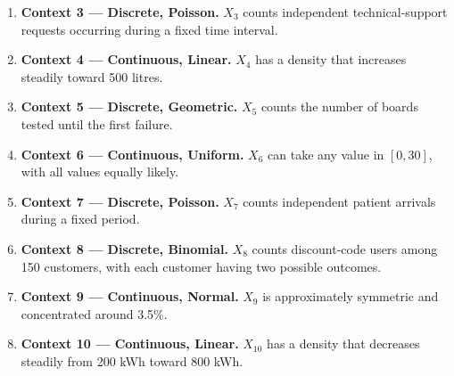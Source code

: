 {\begin{enumerate}
			\item \textbf{Context 3 — Discrete, Poisson.}
			\(X_3\) counts independent technical-support requests occurring
			during a fixed time interval.
			
			\item \textbf{Context 4 — Continuous, Linear.}
			\(X_4\) has a density that increases steadily toward 500 litres.
			
			\item \textbf{Context 5 — Discrete, Geometric.}
			\(X_5\) counts the number of boards tested until the first failure.
			
			\item \textbf{Context 6 — Continuous, Uniform.}
			\(X_6\) can take any value in \([0,30]\), with all values equally likely.
			
			\item \textbf{Context 7 — Discrete, Poisson.}
			\(X_7\) counts independent patient arrivals during a fixed period.
			
			\item \textbf{Context 8 — Discrete, Binomial.}
			\(X_8\) counts discount-code users among 150 customers, with each
			customer having two possible outcomes.
			
			\item \textbf{Context 9 — Continuous, Normal.}
			\(X_9\) is approximately symmetric and concentrated around 3.5\%.
			
			\item \textbf{Context 10 — Continuous, Linear.}
			\(X_{10}\) has a density that decreases steadily from 200 kWh
			toward 800 kWh.
			
		\end{enumerate}
		
		\vspace{-5mm}
		
	}
	
